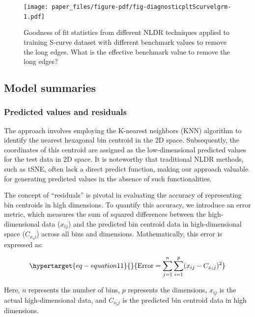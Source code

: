 \documentclass[
  12pt]{article}
\begin{document}
\begin{figure}

{\centering \texttt{[image: paper\_files/figure-pdf/fig-diagnosticpltScurvelgrm-1.pdf]}

}

\caption{\label{fig-diagnosticpltScurvelgrm}Goodness of fit statistics
from different NLDR techniques applied to training S-curve dataset with
different benchmark values to remove the long edges. What is the
effective benchmark value to remove the long edges?}

\end{figure}

\hypertarget{sec-summary}{%
\subsection{Model summaries}\label{sec-summary}}

\hypertarget{predicted-values-and-residuals}{%
\subsubsection{Predicted values and
residuals}\label{predicted-values-and-residuals}}

The approach involves employing the K-nearest neighbors (KNN) algorithm
to identify the nearest hexagonal bin centroid in the 2D space.
Subsequently, the coordinates of this centroid are assigned as the
low-dimensional predicted values for the test data in 2D space. It is
noteworthy that traditional NLDR methods, such as tSNE, often lack a
direct predict function, making our approach valuable for generating
predicted values in the absence of such functionalities.

The concept of ``residuals'' is pivotal in evaluating the accuracy of
representing bin centroids in high dimensions. To quantify this
accuracy, we introduce an error metric, which measures the sum of
squared differences between the high-dimensional data (\(x_{ij}\)) and
the predicted bin centroid data in high-dimensional space (\(C_{x_ij}\))
across all bins and dimensions. Mathematically, this error is expressed
as:

\begin{equation}\protect\hypertarget{eq-equation11}{}{
\text{Error} = \sum_{j = 1}^{n}\sum_{i = 1}^{p} (x_{ij} - C_{x_ij})^2
}\label{eq-equation11}\end{equation}

Here, \(n\) represents the number of bins, \(p\) represents the
dimensions, \(x_{ij}\) is the actual high-dimensional data, and
\(C_{x_ij}\) is the predicted bin centroid data in high dimensions.
\end{document}
